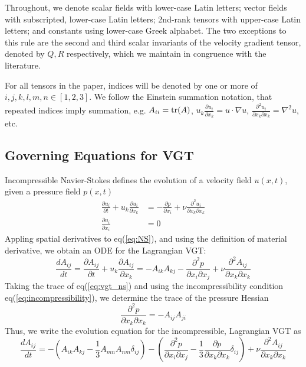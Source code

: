 Throughout, we denote scalar fields with lower-case Latin letters; vector fields with subscripted, lower-case Latin letters; 2nd-rank tensors with upper-case Latin letters; and constants using lower-case Greek alphabet. The two exceptions to this rule are the second and third scalar invariants of the velocity gradient tensor, denoted by $Q, R$ respectively, which we maintain in congruence with the literature. 

For all tensors in the paper, indices will be denoted by one or more of $i,j,k,l,m,n \in [1,2,3]$.
We follow the Einstein summation notation, that repeated indices imply summation, e.g. $A_{ii} = \text{tr}(A)$, $u_k \frac{\partial u_i}{\partial x_k} = u \cdot \nabla u$, $\frac{\partial^2 u_i}{\partial x_k \partial x_k} = \nabla^2 u$, etc.


\subsection{Governing Equations for VGT}
Incompressible Navier-Stokes defines the evolution of a velocity field $u(x,t)$, given a pressure field $p(x,t)$
    \begin{align} \label{eq:NS}
      \frac{\partial u_i}{\partial t} + u_k \frac{\partial u_i}{\partial x_k} &= -\frac{\partial p}{\partial x_i} + \nu \frac{\partial^2 u_i}{\partial x_k \partial x_k}\\
      \frac{\partial u_i}{\partial x_i} &= 0 \label{eq:incompressibility}
    \end{align}
Appling spatial derivatives to eq(\ref{eq:NS}), and using the definition of material derivative, we obtain an ODE for the Lagrangian VGT:
\begin{equation}
  \frac{dA_{ij}}{dt} = \frac{\partial A_{ij}}{\partial t} + u_k \frac{\partial A_{ij}}{\partial x_k} = - A_{ik}A_{kj} - \frac{\partial^2 p}{\partial x_i \partial x_j} + \nu \frac{\partial^2 A_{ij}}{\partial x_k \partial x_k} \label{eq:vgt_ns}
\end{equation}
Taking the trace of eq(\ref{eq:vgt_ns}) and using the incompressibility condition eq(\ref{eq:incompressibility}), we determine the trace of the pressure Hessian
\begin{equation}
 \frac{\partial^2 p}{\partial x_k \partial x_k} = - A_{ij}A_{ji}
\end{equation}
Thus, we write the evolution equation for the incompressible, Lagrangian VGT as
\begin{equation}
  \frac{dA_{ij}}{dt} = - \left(A_{ik}A_{kj} - \frac{1}{3}A_{mn}A_{nm}\delta_{ij}\right) - \left( \frac{\partial^2 p}{\partial x_i \partial x_j} - \frac{1}{3}\frac{\partial p}{\partial x_k \partial x_k}\delta_{ij}  \right) + \nu \frac{\partial^2 A_{ij}}{\partial x_k \partial x_k}
\end{equation}

